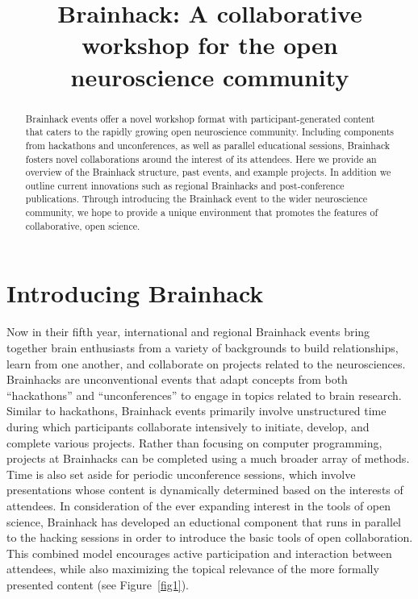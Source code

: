 \documentclass[11pt]{bmc_article_s50}
\begin{document}

\title{Brainhack: A collaborative workshop for the open neuroscience community}
\maketitle


\begin{abstract} %
Brainhack events offer a novel workshop format with participant-generated content that caters to the rapidly growing open neuroscience community. Including components from hackathons and unconferences, as well as parallel educational sessions, Brainhack fosters novel collaborations around the interest of its attendees. Here we provide an overview of the Brainhack structure, past events, and example projects. In addition we outline current innovations such as regional Brainhacks and post-conference publications. Through introducing the Brainhack event to the wider neuroscience community, we hope to provide a unique environment that promotes the features of collaborative, open science.

\end{abstract}


\section{Introducing Brainhack}

Now in their fifth year, international and regional Brainhack events bring together brain enthusiasts from a variety of backgrounds to build relationships, learn from one another, and collaborate on projects related to the neurosciences. Brainhacks are unconventional events that adapt concepts from both ``hackathons'' and ``unconferences'' to engage in topics related to brain research. Similar to hackathons, Brainhack events primarily involve unstructured time during which participants collaborate intensively to initiate, develop, and complete various projects. Rather than focusing on computer programming, projects at Brainhacks can be completed using a much broader array of methods. Time is also set aside for periodic unconference sessions, which involve presentations whose content is dynamically determined based on the interests of attendees. In consideration of the ever expanding interest in the tools of open science, Brainhack has developed an eductional component that runs in parallel to the hacking sessions in order to introduce the basic tools of open collaboration. This combined model encourages active participation and interaction between attendees, while also maximizing the topical relevance of the more formally presented content (see Figure~\ref{fig1}).
\end{document}
